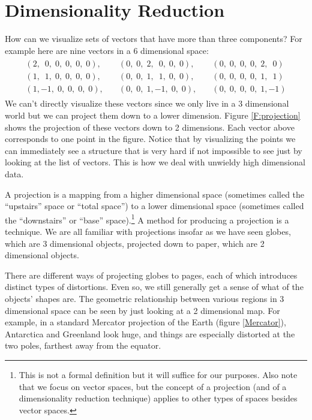 \section{Dimensionality Reduction}
\label{S:dimred}


   How can we visualize sets of vectors that have more than three components?  For
example here are nine vectors in a 6 dimensional space:
\begin{eqnarray*}
\begin{array}{rrr}
  ( 2,\;~0,\; 0,\; 0,\; 0,\; 0), \quad 
& ( 0,\; 0,\; 2,\;~0,\; 0,\; 0), \quad 
& ( 0,\; 0,\; 0,\; 0,\; 2,\;~0)  \\
  ( 1,\;~1,\; 0,\; 0,\; 0,\; 0), \quad 
& ( 0,\; 0,\; 1,\;~1,\; 0,\; 0), \quad 
& ( 0,\; 0,\; 0,\; 0,\; 1,\;~1)  \\
  ( 1,  -1,\; 0,\; 0,\; 0,\; 0), \quad 
& ( 0,\; 0,\; 1,  -1,\; 0,\; 0), \quad 
& ( 0,\; 0,\; 0,\; 0,\; 1,  -1)
\end{array}
\end{eqnarray*}
We can't directly visualize these vectors since we only live in a 3 dimensional 
world but we can project them down to a lower dimension. Figure
\ref{F:projection} shows the projection of these vectors down to 2 dimensions.
Each vector above corresponds to one point in the figure. Notice that by 
visualizing the points we can immediately see a structure that is very hard if 
not impossible to see just by looking at the list of vectors. This is how we deal with unwieldy high dimensional data. 

A projection is a mapping from a higher dimensional space (sometimes called the ``upstairs'' space or ``total space'') to a lower dimensional space (sometimes called the ``downstairs'' or ``base'' space).\footnote{This is not a formal definition but it will suffice for our purposes. Also note that we focus on vector spaces, but the concept of a projection (and of a dimensionality reduction technique) applies to other types of spaces besides vector spaces.} A method for producing a projection is a  technique. We are all 
familiar with projections insofar as we have seen globes, which are 3 
dimensional objects, projected down to paper, which are 2 dimensional objects. 

    There are different ways of projecting globes to pages, each of which introduces distinct types of distortions. Even so, we still generally get a sense of what of the objects' shapes are. The geometric relationship between 
various regions in 3 dimensional space can be seen by just looking at a 2 
dimensional map. For example, in a standard Mercator projection of the Earth 
(figure \ref{Mercator}), Antarctica and Greenland look huge, and things are 
especially distorted at the two poles, farthest away from the equator.


